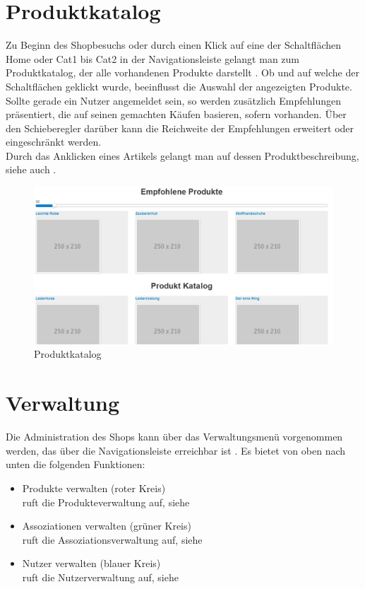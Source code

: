 \section{Produktkatalog}
Zu Beginn des Shopbesuchs oder durch einen Klick auf eine der Schaltflächen Home oder Cat1 bis Cat2 in der Navigationsleiste gelangt man zum Produktkatalog, der alle vorhandenen Produkte darstellt . Ob und auf welche der Schaltflächen geklickt wurde, beeinflusst die Auswahl der angezeigten Produkte. \\
Sollte gerade ein Nutzer angemeldet sein, so werden zusätzlich Empfehlungen prä\-sen\-tiert, die auf seinen gemachten Käufen basieren, sofern vorhanden. Über den Schieberegler darüber kann die Reichweite der Empfehlungen erweitert oder eingeschränkt werden. \\
Durch das Anklicken eines Artikels gelangt man auf dessen Produktbeschreibung, siehe auch .

\begin{figure}[h!]
  \centering
  \includegraphics[width=\textwidth]{img/Produktkatalog.png}
  \caption{Produktkatalog}
  \label{fig:Produktkatalog}
\end{figure}


\section{Verwaltung}
Die Administration des Shops kann über das Verwaltungsmenü vorgenommen werden, das über die Navigationsleiste erreichbar ist . Es bietet von oben nach unten die folgenden Funktionen:
\begin{itemize}
  \item Produkte verwalten (roter Kreis) \\
        ruft die Produkteverwaltung auf, siehe 
  \vspace*{-0.5em}
  \item Assoziationen verwalten (grüner Kreis) \\
        ruft die Assoziationsverwaltung auf, siehe 
  \vspace*{-0.5em}
  \item Nutzer verwalten (blauer Kreis) \\
        ruft die Nutzerverwaltung auf, siehe 
\end{itemize}


